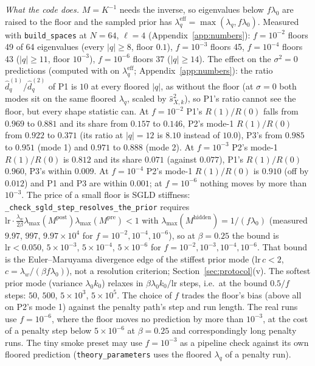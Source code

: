 \documentclass[11pt,a4paper]{article}
\newcommand{\code}[1]{\texttt{#1}}
\begin{document}
\emph{What the code does.} $M = K^{-1}$ needs the inverse, so eigenvalues below $f\lambda_0$ are raised to the floor and the sampled prior has $\lambda_q^{\mathrm{eff}} = \max(\lambda_q, f\lambda_0)$. Measured with \code{build\_spaces} at $N = 64$, $\ell = 4$ (Appendix~\ref{app:numbers}): $f = 10^{-2}$ floors 49 of 64 eigenvalues (every $|q|\ge8$, floor $0.1$), $f = 10^{-3}$ floors 45, $f = 10^{-4}$ floors 43 ($|q|\ge11$, floor $10^{-3}$), $f = 10^{-6}$ floors 37 ($|q|\ge14$). The effect on the $\sigma^2 = 0$ predictions (computed with  on $\lambda_q^{\mathrm{eff}}$; Appendix~\ref{app:numbers}): the ratio $\hat d^{(1)}_q/\hat d^{(2)}_q$ of P1 is $10$ at every floored $|q|$, as without the floor (at $\sigma = 0$ both modes sit on the same floored $\lambda_q$, scaled by $\hat s_{X,k}^2$), so P1's ratio cannot see the floor, but every shape statistic can. At $f = 10^{-2}$ P1's $R(1)/R(0)$ falls from $0.969$ to $0.881$ and its share from $0.157$ to $0.146$, P2's mode-1 $R(1)/R(0)$ from $0.922$ to $0.371$ (its ratio at $|q| = 12$ is $8.10$ instead of $10.0$), P3's from $0.985$ to $0.951$ (mode 1) and $0.971$ to $0.888$ (mode 2). At $f = 10^{-3}$ P2's mode-1 $R(1)/R(0)$ is $0.812$ and its share $0.071$ (against $0.077$), P1's $R(1)/R(0)$ $0.960$, P3's within $0.009$. At $f = 10^{-4}$ P2's mode-1 $R(1)/R(0)$ is $0.910$ (off by $0.012$) and P1 and P3 are within $0.001$; at $f = 10^{-6}$ nothing moves by more than $10^{-3}$. The price of a small floor is SGLD stiffness: \code{\_check\_sgld\_step\_resolves\_the\_prior} requires $\mathrm{lr}\cdot\frac{\lambda_w}{2\beta}\lambda_{\max}(M^{\mathrm{post}})\lambda_{\max}(M^{\mathrm{pre}}) < 1$ with $\lambda_{\max}(M^{\mathrm{hidden}}) = 1/(f\lambda_0)$ (measured $9.97$, $997$, $9.97\times10^4$ for $f = 10^{-2}, 10^{-4}, 10^{-6}$), so at $\beta = 0.25$ the bound is $\mathrm{lr} < 0.050$, $5\times10^{-3}$, $5\times10^{-4}$, $5\times10^{-6}$ for $f = 10^{-2}, 10^{-3}, 10^{-4}, 10^{-6}$. That bound is the Euler--Maruyama divergence edge of the stiffest prior mode ($\mathrm{lr}\,c < 2$, $c = \lambda_w/(\beta f\lambda_0)$), not a resolution criterion; Section~\ref{sec:protocol}(v). The softest prior mode (variance $\lambda_0k_0$) relaxes in $\beta\lambda_0k_0/\mathrm{lr}$ steps, i.e.\ at the bound $0.5/f$ steps: $50$, $500$, $5\times10^3$, $5\times10^5$. The choice of $f$ trades the floor's bias (above all on P2's mode 1) against the penalty path's step and run length. The real runs use $f = 10^{-6}$, where the floor moves no prediction by more than $10^{-3}$, at the cost of a penalty step below $5\times10^{-6}$ at $\beta = 0.25$ and correspondingly long penalty runs. The tiny smoke preset may use $f = 10^{-3}$ as a pipeline check against its own floored prediction (\code{theory\_parameters} uses the floored $\lambda_q$ of a penalty run).
\end{document}
